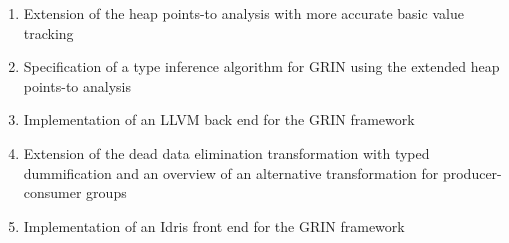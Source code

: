 \documentclass[main.tex]{subfiles}
\begin{document}
	\hspace{0.5cm}
	\begin{enumerate}
		\item Extension of the heap points-to analysis with more accurate basic value tracking

		\item Specification of a type inference algorithm for GRIN using the extended heap points-to analysis
		
		\item Implementation of an LLVM back end for the GRIN framework
		
		\item Extension of the dead data elimination transformation with typed dummification and an overview of an alternative transformation for producer-consumer groups
		
		\item Implementation of an Idris front end for the GRIN framework
	\end{enumerate}
	
\end{document}
